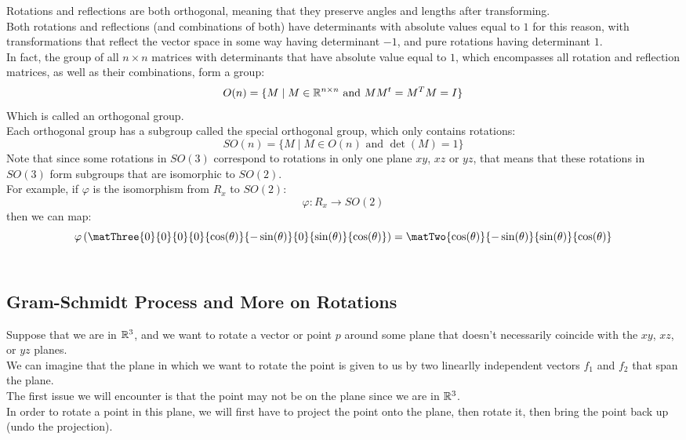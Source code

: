 \documentclass[12pt]{article}
\begin{document}
Rotations and reflections are both
orthogonal, meaning that they preserve
angles and lengths after transforming. \\
Both rotations and reflections
(and combinations of both)
have determinants with absolute values
equal to $1$ for this reason,
with transformations that reflect
the vector space in some way having
determinant $-1$,
and pure rotations having determinant $1$. \\

In fact, the group of all $n \times n$
matrices with determinants
that have absolute value equal to $1$,
which encompasses all rotation and reflection
matrices, as well as their combinations,
form a group:
\[ O(n) = \{ M \mid M \in \mathbb{R}^{n \times n}
\text{ and } MM^t = M^TM = I \} \]
Which is called an orthogonal group. \\

Each orthogonal group has a
subgroup called the special
orthogonal group, which only contains
rotations:
\[ SO(n) = \{ M \mid M \in O(n)
\text{ and } \det(M) = 1 \} \]
Note that since some
rotations in $SO(3)$
correspond to rotations in only
one plane $xy$, $xz$ or $yz$,
that means that these rotations
in $SO(3)$ form subgroups that are
isomorphic to $SO(2)$. \\

For example, if $\varphi$
is the isomorphism from $R_x$
to $SO(2)$:
\[ \varphi: R_x \to SO(2) \]
then we can map:
\[ \varphi\para{
\matThree{0}{0}{0}{0}{\cos(\theta)}
{-\sin(\theta)}{0}{\sin(\theta)}
{\cos(\theta)}}
= \matTwo{\cos(\theta)}
{-\sin(\theta)}{\sin(\theta)}
{\cos(\theta)} \] \\

\newpage

\subsection*{Gram-Schmidt Process and
More on Rotations}

Suppose that we are in $\mathbb{R}^3$,
and we want to rotate
a vector or point $p$ around some plane
that doesn't necessarily coincide
with the $xy$, $xz$, or $yz$ planes. \\

We can imagine that the plane in which we
want to rotate the point is given to
us by two linearlly independent vectors
$f_1$ and $f_2$ that span the plane. \\

The first issue we will encounter is that
the point may not be on the plane
since we are in $\mathbb{R}^3$. \\
In order to rotate a point in this plane,
we will first have to project the point
onto the plane,
then rotate it, then bring the point back up
(undo the projection). \\
\end{document}
